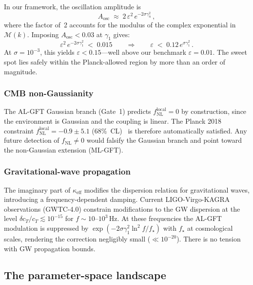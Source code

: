 \documentclass[12pt,a4paper]{article}
\begin{document}
In our framework, the oscillation amplitude is
\begin{equation}\label{eq:Aosc-map}
  A_{\mathrm{osc}}
  \;\approx\;
  2\,\varepsilon^2\,e^{-2\sigma\gamma_n^2}\,,
\end{equation}
where the factor of~2 accounts for the modulus of the
complex exponential in~$\mathcal{M}(k)$.
Imposing $A_{\mathrm{osc}}<0.03$ at $\gamma_1$ gives:
\begin{equation}\label{eq:planck-bound}
  \varepsilon^2\,e^{-2\sigma\gamma_1^2}
  \;<\;
  0.015
  \qquad\Longrightarrow\qquad
  \varepsilon \;<\;
  0.12\,e^{\sigma\gamma_1^2}\,.
\end{equation}
At $\sigma = 10^{-3}$, this yields
$\varepsilon < 0.15$---well above our benchmark
$\varepsilon = 0.01$.
The sweet spot lies safely within the Planck-allowed
region by more than an order of magnitude.


\subsubsection{CMB non-Gaussianity}

The AL-GFT Gaussian branch (Gate~1) predicts
$f_{\mathrm{NL}}^{\mathrm{local}} = 0$ by construction,
since the environment is Gaussian and the coupling is
linear.  The Planck 2018 constraint
$f_{\mathrm{NL}}^{\mathrm{local}} = -0.9\pm 5.1$
(68\%~CL)~\cite{Planck2018IX} is therefore
automatically satisfied.
Any future detection of $f_{\mathrm{NL}}\neq 0$
would falsify the Gaussian branch and point toward
the non-Gaussian extension (ML-GFT).


\subsubsection{Gravitational-wave propagation}

The imaginary part of $\kappa_{\mathrm{eff}}$
modifies the dispersion relation for gravitational
waves, introducing a frequency-dependent damping.
Current LIGO-Virgo-KAGRA observations (GWTC-4.0)
constrain modifications to the GW dispersion at the level
$\delta c_T/c_T \lesssim 10^{-15}$ for
$f\sim 10$--$10^3\,$Hz.
At these frequencies the AL-GFT modulation is
suppressed by $\exp(-2\sigma\gamma_1^2\ln^2 f/f_\star)$
with $f_\star$ at cosmological scales, rendering
the correction negligibly small
($\ll 10^{-20}$).  There is no tension with
GW propagation bounds.


\subsection{The parameter-space landscape}
\label{sec:landscape}
\end{document}
